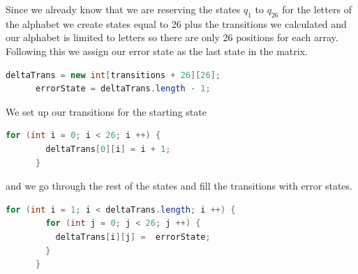 \documentclass[letter, 12pt]{article}
\begin{document}
Since we already know that we are reserving the states $q_1$ to $q_26$ for the letters of the alphabet we create states equal to 26 plus the transitions we calculated and our alphabet is limited to letters so there are only 26 positions for each array. Following this we assign our error state as the last state in the matrix. 
\begin{lstlisting}[language=Java]
      deltaTrans = new int[transitions + 26][26];
      errorState = deltaTrans.length - 1;
\end{lstlisting} 
We set up our transitions for the starting state 
\begin{lstlisting}[language=Java]
      for (int i = 0; i < 26; i ++) {
        deltaTrans[0][i] = i + 1;
      }
\end{lstlisting}
and we go through the rest of the states and fill the transitions with error states.
\begin{lstlisting}[language=Java]
      for (int i = 1; i < deltaTrans.length; i ++) {
        for (int j = 0; j < 26; j ++) {
          deltaTrans[i][j] =  errorState;
        }
      }
\end{lstlisting}
\end{document}
